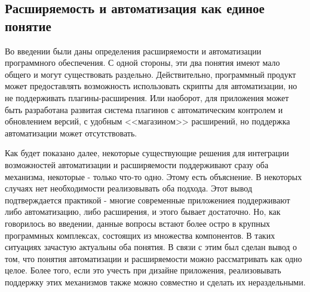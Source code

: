 \subsection{Расширяемость и автоматизация как единое понятие}

Во введении были даны определения расширяемости и автоматизации программного обеспечения. С одной стороны, эти два понятия имеют мало общего и могут существовать раздельно. Действительно, программный продукт может предоставлять возможность использовать скрипты для автоматизации, но не поддерживать плагины-расширения. Или наоборот, для приложения может быть разработана развитая система плагинов с автоматическим контролем и обновлением версий, с удобным <<магазином>> расширений, но поддержка автоматизации может отсутствовать.

Как будет показано далее, некоторые существующие решения для интеграции возможностей автоматизации и расширяемости поддерживают сразу оба механизма, некоторые - только что-то одно. Этому есть объяснение. В некоторых случаях нет необходимости реализовывать оба подхода. Этот вывод подтверждается практикой - многие современные приложениея поддерживают либо автоматизацию, либо расширения, и этого бывает достаточно. Но, как говорилось во введении, данные вопросы встают более остро в крупных программных комплексах, состоящих из множества компонентов. В таких ситуациях зачастую актуальны оба понятия. В связи с этим был сделан вывод о том, что понятия автоматизации и расширяемости можно рассматривать как одно целое. Более того, если это учесть при дизайне приложения, реализовывать поддержку этих механизмов также можно совместно и сделать их нераздельными.

